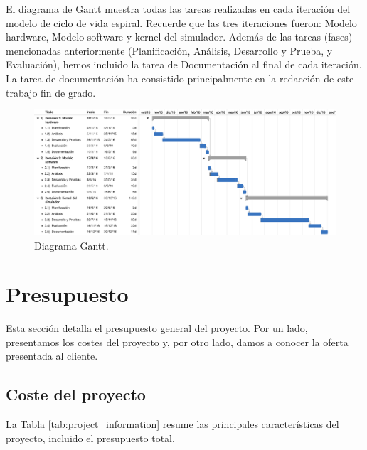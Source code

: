 El diagrama de Gantt muestra todas las tareas realizadas en cada iteración del modelo de ciclo de vida espiral. Recuerde que las tres iteraciones fueron: Modelo hardware, Modelo software y kernel del simulador. Además de las tareas (fases) mencionadas anteriormente (Planificación, Análisis, Desarrollo y Prueba, y Evaluación), hemos incluido la tarea de Documentación al final de cada iteración. La tarea de documentación ha consistido principalmente en la redacción de este trabajo fin de grado.

\begin{figure}[htbp]
 	\centering
 	\includegraphics[width=16.5cm]{figures/ganttFuente}
 	\caption{Diagrama Gantt.}
	\label{fig:gantt}
\end{figure}

\section{Presupuesto}
\label{sec:budget}

Esta sección detalla el presupuesto general del proyecto. Por un lado, presentamos los costes del proyecto y, por otro lado, damos a conocer la oferta presentada al cliente.

\subsection{Coste del proyecto}

La Tabla \ref{tab:project_information} resume las principales características del proyecto, incluido el presupuesto total.

